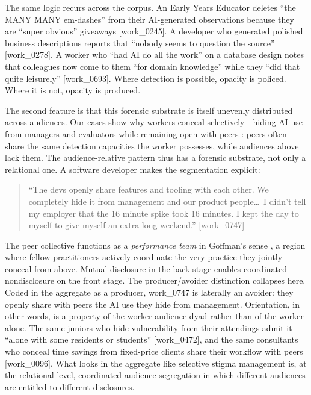 \documentclass[pdflatex,sn-basic]{sn-jnl}%
\theoremstyle{thmstyleone}%
\theoremstyle{thmstyletwo}%
\theoremstyle{thmstylethree}%
\begin{document}
The same logic recurs across the corpus. An Early Years Educator deletes ``the MANY MANY em-dashes'' from their AI-generated observations because they are ``super obvious'' giveaways [work\_0245]. A developer who generated polished business descriptions reports that ``nobody seems to question the source'' [work\_0278]. A worker who ``had AI do all the work'' on a database design notes that colleagues now come to them ``for domain knowledge'' while they ``did that quite leisurely'' [work\_0693]. Where detection is possible, opacity is policed. Where it is not, opacity is produced.
 
The second feature is that this forensic substrate is itself unevenly distributed across audiences. Our cases show why workers conceal selectively---hiding AI use from managers and evaluators while remaining open with peers \citep{xia2026clever}: peers often share the same detection capacities the worker possesses, while audiences above lack them. The audience-relative pattern thus has a forensic substrate, not only a relational one. A software developer makes the segmentation explicit:

\begin{quote}
``The devs openly share features and tooling with each other. We completely hide it from management and our product people\ldots\ I didn't tell my employer that the 16 minute spike took 16 minutes. I kept the day to myself to give myself an extra long weekend.'' [work\_0747]
\end{quote}

The peer collective functions as a \textit{performance team} in Goffman's sense \citep{goffman1959presentation}, a region where fellow practitioners actively coordinate the very practice they jointly conceal from above. Mutual disclosure in the back stage enables coordinated nondisclosure on the front stage. The producer/avoider distinction collapses here. Coded in the aggregate as a producer, work\_0747 is laterally an avoider: they openly share with peers the AI use they hide from management. Orientation, in other words, is a property of the worker-audience dyad rather than of the worker alone. The same juniors who hide vulnerability from their attendings admit it ``alone with some residents or students'' [work\_0472], and the same consultants who conceal time savings from fixed-price clients share their workflow with peers [work\_0096]. What looks in the aggregate like selective stigma management is, at the relational level, coordinated audience segregation in which different audiences are entitled to different disclosures.
 
\end{document}
